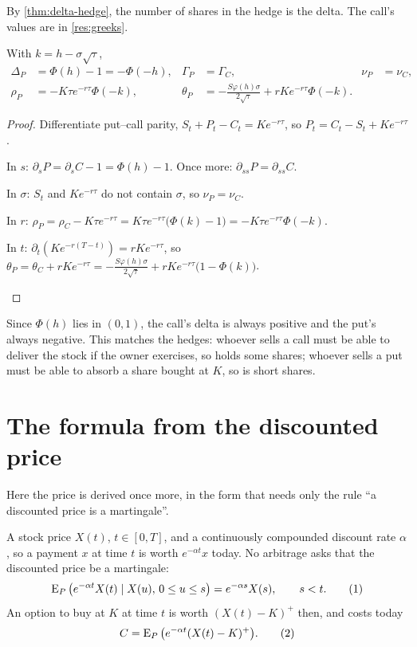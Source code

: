 By \cref{thm:delta-hedge}, the number of shares in the hedge is the delta. The call's values are in \cref{res:greeks}.

\begin{result}
\label{res:put-greeks}
With $k=h-\sigma\sqrt\tau$,
\[
  \begin{aligned}
  \Delta_P&=\Phi(h)-1=-\Phi(-h), &\Gamma_P&=\Gamma_C, &\nu_P&=\nu_C,\\
  \rho_P&=-K\tau e^{-r\tau}\Phi(-k), &\theta_P&=-\frac{S\varphi(h)\sigma}{2\sqrt\tau}+rKe^{-r\tau}\Phi(-k).
  \end{aligned}
\]
\end{result}
\begin{proof}
Differentiate put--call parity, $S_t+P_t-C_t=Ke^{-r\tau}$, so $P_t=C_t-S_t+Ke^{-r\tau}$.
\begin{steps}
  \item In $s$: $\partial_sP=\partial_sC-1=\Phi(h)-1$. Once more: $\partial_{ss}P=\partial_{ss}C$.
  \item In $\sigma$: $S_t$ and $Ke^{-r\tau}$ do not contain $\sigma$, so $\nu_P=\nu_C$.
  \item In $r$: $\rho_P=\rho_C-K\tau e^{-r\tau}=K\tau e^{-r\tau}\big(\Phi(k)-1\big)=-K\tau e^{-r\tau}\Phi(-k)$.
  \item In $t$: $\partial_t(Ke^{-r(T-t)})=rKe^{-r\tau}$, so $\theta_P=\theta_C+rKe^{-r\tau}=-\frac{S\varphi(h)\sigma}{2\sqrt\tau}+rKe^{-r\tau}\big(1-\Phi(k)\big)$. \qedhere
\end{steps}
\end{proof}

Since $\Phi(h)$ lies in $(0,1)$, the call's delta is always positive and the put's always negative. This matches the hedges: whoever sells a call must be able to deliver the stock if the owner exercises, so holds some shares; whoever sells a put must be able to absorb a share bought at $K$, so is short shares.

\section{The formula from the discounted price}

Here the price is derived once more, in the form that needs only the rule ``a discounted price is a martingale''.

\begin{setup}
A stock price $X(t)$, $t\in[0,T]$, and a continuously compounded discount rate $\alpha$, so a payment $x$ at time $t$ is worth $e^{-\alpha t}x$ today. No arbitrage asks that the discounted price be a martingale:
\[
  \operatorname{E}_P\big(e^{-\alpha t}X(t)\mid X(u),\,0\le u\le s\big)=e^{-\alpha s}X(s),\qquad s<t. \tag{1}
\]
An option to buy at $K$ at time $t$ is worth $(X(t)-K)^+$ then, and costs today
\[
  C=\operatorname{E}_P\big(e^{-\alpha t}(X(t)-K)^+\big). \tag{2}
\]
\end{setup}


